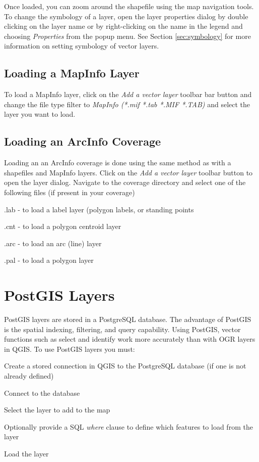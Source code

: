 Once loaded, you can zoom around the shapefile using the map navigation tools. To change the symbology of a layer, open the layer properties dialog by double clicking on the layer name or by right-clicking on the name in the legend and choosing \textsl{Properties} from the popup menu. See Section \ref{sec:symbology} for more information on setting symbology of vector layers.
\subsection{Loading a MapInfo Layer}
To load a MapInfo layer, click on the \textit{Add a vector layer}
toolbar bar button and change the file type filter to \textit{MapInfo (*.mif
*.tab *.MIF *.TAB)} and select the layer you want to load.

\subsection{Loading an ArcInfo Coverage}
Loading an an ArcInfo coverage is done using the same method as with a
shapefiles and MapInfo layers. Click on the \textit{Add a vector layer} toolbar
button to open the layer dialog.  Navigate to the coverage directory and select
one of the following files (if present in your coverage)
\begin{compactenum}
\item .lab - to load a label layer (polygon labels, or standing points
\item .cnt - to load a polygon centroid layer 
\item .arc - to load an arc (line) layer
\item .pal - to load a polygon layer
\end{compactenum}

\section{PostGIS Layers}
PostGIS layers are stored in a PostgreSQL database. The advantage of PostGIS is the spatial indexing, filtering, and query capability. Using PostGIS, vector functions such as select and identify work more accurately than with OGR layers in QGIS.
To use PostGIS layers you must:
\begin{compactenum}
\item Create a stored connection in QGIS to the PostgreSQL database (if one is
not already defined)
\item Connect to the database
\item Select the layer to add to the map
\item Optionally provide a SQL \textit{where} clause to define which features to load from the layer
\item Load the layer
\end{compactenum}

